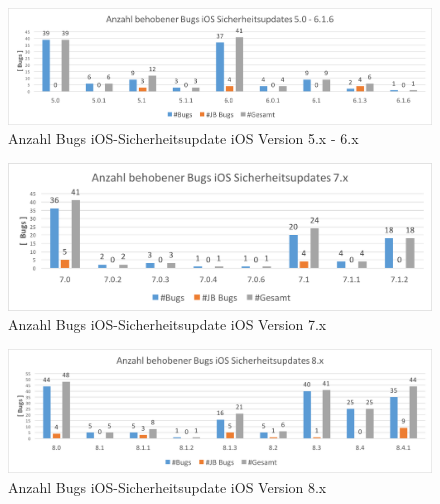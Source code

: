 \begin{figure}[hp!]
        \centering
                \includegraphics[scale=0.5]{Bilder/iOSSicherheitsupdate5.png}
        \caption{Anzahl Bugs iOS-Sicherheitsupdate iOS Version 5.x - 6.x  \protect\footnotemark}
        \label{fig:AnalyseiOSSicherheitsupdate5}
\end{figure}

\begin{figure}[hp!]
        \centering
                \includegraphics[scale=0.7]{Bilder/iOSSicherheitsupdate7.png}
        \caption{Anzahl Bugs iOS-Sicherheitsupdate iOS Version 7.x \protect\footnotemark}
        \label{fig:AnalyseiOSSicherheitsupdate7}
\end{figure}

\begin{figure}[hp!]
        \centering
                \includegraphics[scale=0.5]{Bilder/iOSSicherheitsupdate8.png}
        \caption{Anzahl Bugs iOS-Sicherheitsupdate iOS Version 8.x \protect\footnotemark}
        \label{fig:AnalyseiOSSicherheitsupdate8}
\end{figure}

